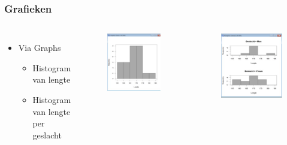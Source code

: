 \documentclass{beamer}
\begin{document}
\begin{frame}
  \frametitle{Grafieken}
  \begin{columns}[c]
    \begin{itemize}
      \item Via Graphs
        \begin{itemize}
          \item Histogram van lengte
          \item Histogram van lengte per geslacht
        \end{itemize}
    \end{itemize}

    \begin{figure}

      \includegraphics[width=.6\textwidth]{img/oef3/histogram-lengte}
    \end{figure}
    \begin{figure}

      \includegraphics[width=.6\textwidth]{img/oef3/histogram-lengte-geslacht}
    \end{figure}
  \end{columns}
\end{frame}
\end{document}
